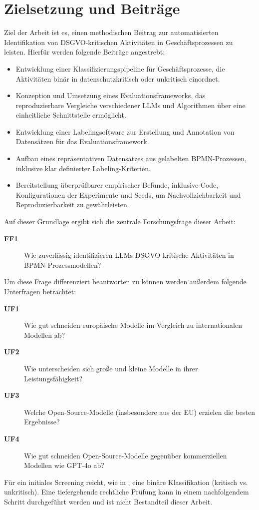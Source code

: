 \section{Zielsetzung und Beiträge}\label{sec:zielsetzung-und-beitrage}

Ziel der Arbeit ist es, einen methodischen Beitrag zur automatisierten Identifikation von \ac{DSGVO}-kritischen Aktivitäten in Geschäftsprozessen zu leisten. Hierfür werden folgende Beiträge angestrebt:

\begin{itemize}
    \item Entwicklung einer Klassifizierungspipeline für Geschäftsprozesse, die Aktivitäten binär in datenschutzkritisch oder unkritisch einordnet.
    \item Konzeption und Umsetzung eines Evaluationsframeworks, das reproduzierbare Vergleiche verschiedener \acp{LLM} und Algorithmen über eine einheitliche Schnittstelle ermöglicht.
    \item Entwicklung einer Labelingsoftware zur Erstellung und Annotation von Datensätzen für das Evaluationsframework.
    \item Aufbau eines repräsentativen Datensatzes aus gelabelten \ac{BPMN}-Prozessen, inklusive klar definierter Labeling-Kriterien.
    \item Bereitstellung überprüfbarer empirischer Befunde, inklusive Code, Konfigurationen der Experimente und Seeds, um Nachvollziehbarkeit und Reproduzierbarkeit zu gewährleisten.
\end{itemize}

Auf dieser Grundlage ergibt sich die zentrale Forschungsfrage dieser Arbeit:

\begin{description}
    \item[\textbf{FF1}] Wie zuverlässig identifizieren \acp{LLM} \ac{DSGVO}-kritische Aktivitäten in \ac{BPMN}-Prozessmodellen?
\end{description}

Um diese Frage differenziert beantworten zu können werden außerdem folgende Unterfragen betrachtet:

\begin{description}
    \item[\textbf{UF1}] Wie gut schneiden europäische Modelle im Vergleich zu internationalen Modellen ab?
    \item[\textbf{UF2}] Wie unterscheiden sich große und kleine Modelle in ihrer Leistungsfähigkeit?
    \item[\textbf{UF3}] Welche Open-Source-Modelle (insbesondere aus der EU) erzielen die besten Ergebnisse?
    \item[\textbf{UF4}] Wie gut schneiden Open-Source-Modelle gegenüber kommerziellen Modellen wie GPT-4o ab?
\end{description}

Für ein initiales Screening reicht, wie in \cite{nake2023towards}, eine binäre Klassifikation (kritisch vs. unkritisch). Eine tiefergehende rechtliche Prüfung kann in einem nachfolgendem Schritt durchgeführt werden und ist nicht Bestandteil dieser Arbeit.